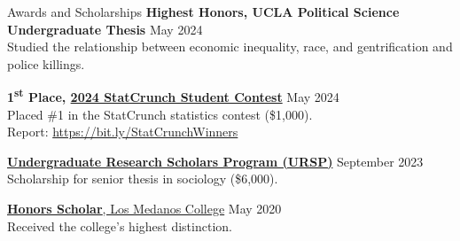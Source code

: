 \documentclass[
	11pt, %
]{resume} %
\begin{document}
\begin{samepage}
\begin{rSection}{Awards and Scholarships}
\textbf{Highest Honors, UCLA Political Science Undergraduate Thesis} \hfill May 2024 \\
Studied the relationship between economic inequality, race, and gentrification and police killings.

\textbf{1\textsuperscript{st} Place, \href{https://www.pearson.com/content/dam/global-store/en-us/resources/StatCrunch-Contest-Terms-Conditions-Contests-Pearson-Education-Inc.pdf}{2024 StatCrunch Student Contest}} \hfill May 2024\\
Placed \#1 in the StatCrunch statistics contest (\$\thinspace{}1,000).\\
Report: \href{https://bit.ly/StatCrunchWinners}{https://bit.ly/StatCrunchWinners}

\href{https://hass.ugresearch.ucla.edu/scholarships/ursp/students/}{\textbf{Undergraduate Research Scholars Program (URSP)}} \hfill September 2023 \\
Scholarship for senior thesis in sociology (\$\thinspace{}6,000).

\href{https://www.losmedanos.edu/honors/prog.aspx\#:~:text=Honors\%20Scholar\%20Requirements}{\textbf{Honors Scholar}, Los Medanos College} \hfill May 2020 \\
Received the college’s highest distinction.
\end{rSection}
\end{samepage}
\end{document}
